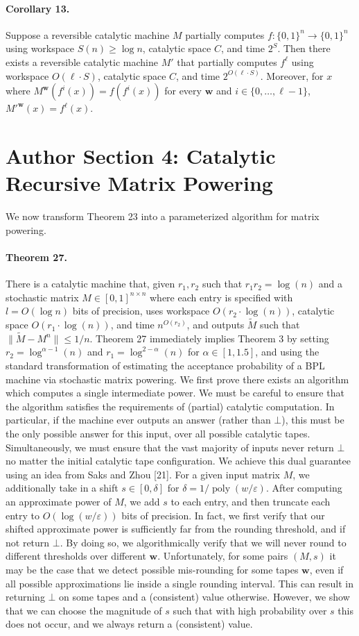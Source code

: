 \paragraph{Corollary 13.} Suppose a reversible catalytic machine $M$ partially computes $f:\{0,1\}^n\to\{0,1\}^n$ using workspace $S(n)\geq\log n$, catalytic space $C$, and time $2^S$. Then there exists a reversible catalytic machine $M'$ that partially computes $f^\ell$ using workspace $O(\ell\cdot S)$, catalytic space $C$, and time $2^{O(\ell\cdot S)}$. Moreover, for $x$ where $M^{\mathbf w}(f^i(x))=f(f^i(x))$ for every $\mathbf w$ and $i\in\{0,\ldots,\ell-1\}$, $M'^{\mathbf w}(x)=f^\ell(x)$.
\section*{Author Section 4: Catalytic Recursive Matrix Powering}
We now transform Theorem 23 into a parameterized algorithm for matrix powering.
\paragraph{Theorem 27.} There is a catalytic machine that, given $r_1,r_2$ such that $r_1r_2=\log(n)$ and a stochastic matrix $M\in[0,1]^{n\times n}$ where each entry is specified with $l=O(\log n)$ bits of precision, uses workspace $O(r_2\cdot\log(n))$, catalytic space $O(r_1\cdot\log(n))$, and time $n^{O(r_2)}$, and outputs $\widetilde M$ such that $\|\widetilde M-M^n\|\leq1/n$.
Theorem 27 immediately implies Theorem 3 by setting $r_2=\log^{\alpha-1}(n)$ and $r_1=\log^{2-\alpha}(n)$ for $\alpha\in[1,1.5]$, and using the standard transformation of estimating the acceptance probability of a BPL machine via stochastic matrix powering.
We first prove there exists an algorithm which computes a single intermediate power. We must be careful to ensure that the algorithm satisfies the requirements of (partial) catalytic computation. In particular, if the machine ever outputs an answer (rather than $\bot$), this must be the only possible answer for this input, over all possible catalytic tapes. Simultaneously, we must ensure that the vast majority of inputs never return $\bot$ no matter the initial catalytic tape configuration.
We achieve this dual guarantee using an idea from Saks and Zhou [21]. For a given input matrix $M$, we additionally take in a shift $s\in[0,\delta]$ for $\delta=1/\operatorname{poly}(w/\varepsilon)$. After computing an approximate power of $M$, we add $s$ to each entry, and then truncate each entry to $O(\log(w/\varepsilon))$ bits of precision. In fact, we first verify that our shifted approximate power is sufficiently far from the rounding threshold, and if not return $\bot$. By doing so, we algorithmically verify that we will never round to different thresholds over different $\mathbf w$. Unfortunately, for some pairs $(M,s)$ it may be the case that we detect possible mis-rounding for some tapes $\mathbf w$, even if all possible approximations lie inside a single rounding interval. This can result in returning $\bot$ on some tapes and a (consistent) value otherwise. However, we show that we can choose the magnitude of $s$ such that with high probability over $s$ this does not occur, and we always return a (consistent) value.
